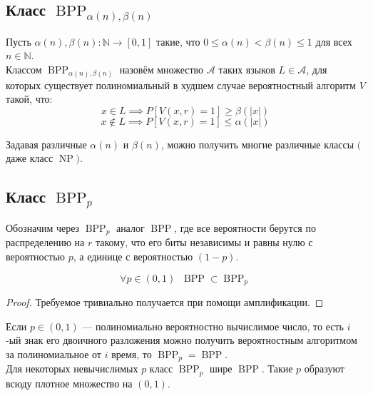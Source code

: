 \documentclass[11pt]{article}
\DeclareMathOperator{\BPP}{BPP}
\DeclareMathOperator{\NP}{NP}
\begin{document}
\subsection{Класс $\BPP_{\alpha(n), \beta(n)}$}

\begin{definition}
    Пусть $\alpha(n), \beta(n) \colon \mathbb{N} \to [0, 1]$ такие, что $0 \leq \alpha(n) < \beta(n) \leq 1$ для всех $n \in \mathbb{N}$. \\
    Классом $\BPP_{\alpha(n), \beta(n)}$ назовём множество $\mathcal{A}$ таких языков $L \in \mathcal{A}$, для которых существует полиномиальный в худшем случае вероятностный алгоритм $V$ такой, что:
    \[x \in L \implies P[V(x, r) = 1] \geq \beta(\left\lvert x \right\rvert)\]
    \[x \not \in L \implies P[V(x, r) = 1] \leq \alpha(\left\lvert x \right\rvert)\]
\end{definition}

\begin{remark}
    Задавая различные $\alpha(n)$ и $\beta(n)$, можно получить многие различные классы $($даже класс $\NP$$)$.
\end{remark}

\subsection{Класс $\BPP_p$}

\begin{definition}
    Обозначим через $\BPP_p$ аналог $\BPP$, где все вероятности берутся по распределению на $r$ такому, что его биты независимы и равны нулю с вероятностью $p$, а единице с вероятностью $(1 - p)$.
\end{definition}

\begin{statement}
    \[\forall p \in (0, 1) \; \; \BPP \subset \BPP_p\]
\end{statement}

\begin{proof}
    Требуемое тривиально получается при помощи амплификации.
\end{proof}

\begin{statement}
    Если $p \in (0, 1)$ --- полиномиально вероятностно вычислимое число, то есть $i$-ый знак его двоичного разложения можно получить вероятностным алгоритмом за полиномиальное от $i$ время, то $\BPP_p = \BPP$. \\
    Для некоторых невычислимых $p$ класс $\BPP_p$ шире $\BPP$. Такие $p$ образуют всюду плотное множество на $(0, 1)$.
\end{statement}
\end{document}
